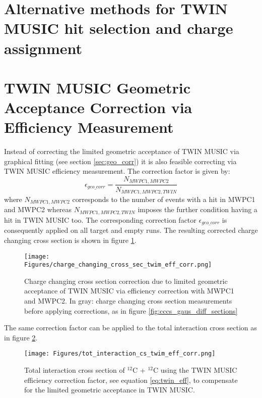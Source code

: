 \begin{appendices}
\section {Alternative methods for TWIN MUSIC hit selection and charge assignment} \label{app:twin_alternative}

\section {TWIN MUSIC Geometric Acceptance Correction via Efficiency Measurement}
Instead of correcting the limited geometric acceptance of TWIN MUSIC via graphical fitting (see section \ref{sec:geo_corr}) it is also feasible correcting via TWIN MUSIC efficiency measurement. The correction factor is given by:
\begin{equation}\label{eq:twin_eff}
\epsilon_{geo\text{\_}corr} = \frac{N_{MWPC1,MWPC2}}{N_{MWPC1,MWPC2,TWIN}}
\end{equation}
where $N_{MWPC1,MWPC2}$ corresponds to the number of events with a hit in MWPC1 and MWPC2 whereas $N_{MWPC1,MWPC2,TWIN}$ imposes the further condition having a hit in TWIN MUSIC too.\newline
The corresponding correction factor $\epsilon_{geo\text{\_}corr}$ is consequently applied on all target and empty runs. The resulting corrected charge changing cross section is shown in figure \ref{fig:twim_corr_cc_cs}. 
\begin{figure}[h!]
    \centering
    \texttt{[image: Figures/charge\_changing\_cross\_sec\_twim\_eff\_corr.png]}
    \caption{
        Charge changing cross section correction due to limited geometric acceptance of TWIN MUSIC via efficiency correction with MWPC1 and MWPC2. In gray: charge changing cross section measurements before applying corrections, as in figure \ref{fig:cccs_gaus_diff_sections}}
    \label{fig:twim_corr_cc_cs}
\end{figure}
The same correction factor can be applied to the total interaction cross section as in figure \ref{fig:twim_corr_tot_cs}. 
\begin{figure}[h!]
    \centering
    \texttt{[image: Figures/tot\_interaction\_cs\_twim\_eff\_corr.png]}
    \caption{
        Total interaction cross section of $^{12}$C + $^{12}$C using the TWIN MUSIC efficiency correction factor, see equation \ref{eq:twin_eff}, to compensate for the limited geometric acceptance in TWIN MUSIC.}
    \label{fig:twim_corr_tot_cs}
\end{figure}
\newpage




\end{appendices}
